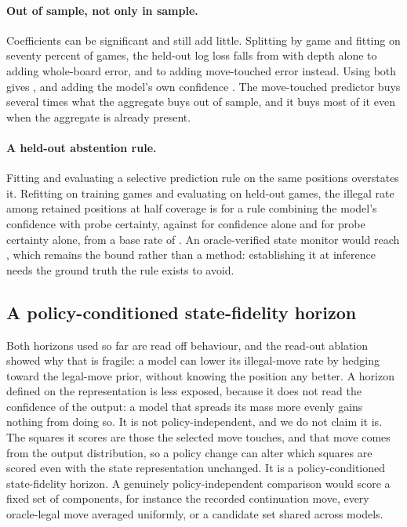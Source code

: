\paragraph{Out of sample, not only in sample.} Coefficients can be significant and
still add little. Splitting by game and fitting on seventy percent of games, the
held-out log loss falls from  with depth alone to
 adding whole-board error, and to 
adding move-touched error instead. Using both gives , and
adding the model's own confidence . The
move-touched predictor buys several times what the aggregate buys out of sample,
and it buys most of it even when the aggregate is already present.

\paragraph{A held-out abstention rule.} Fitting and evaluating a selective
prediction rule on the same positions overstates it. Refitting on training games
and evaluating on held-out games, the illegal rate among retained positions at
half coverage is  for a rule combining the model's confidence
with probe certainty, against  for confidence alone and
 for probe certainty alone, from a base rate of
. An oracle-verified state monitor would reach
, which remains the bound rather than a method: establishing it
at inference needs the ground truth the rule exists to avoid.


\subsection{A policy-conditioned state-fidelity horizon}
\label{sec:hfid}

Both horizons used so far are read off behaviour, and the read-out ablation
showed why that is fragile: a model can lower its illegal-move rate by hedging
toward the legal-move prior, without knowing the position any better. A horizon
defined on the representation is less exposed, because it does not read the
confidence of the output: a model that spreads its mass more evenly gains nothing
from doing so. It is not policy-independent, and we do not claim it is. The
squares it scores are those the selected move touches, and that move comes from
the output distribution, so a policy change can alter which squares are scored
even with the state representation unchanged. It is a policy-conditioned
state-fidelity horizon. A genuinely policy-independent comparison would score a
fixed set of components, for instance the recorded continuation move, every
oracle-legal move averaged uniformly, or a candidate set shared across models.

